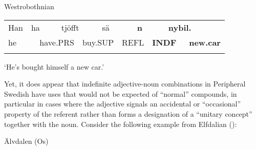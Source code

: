 \begin{listWWNumileveli}
\item {}

\begin{styleExample}
\label{bkm:Ref154565993}Westrobothnian

\end{styleExample}

\end{listWWNumileveli}

\begin{tabular}{llllllllllll}
\lsptoprule
Han & \multicolumn{2}{l}{ha

} & \multicolumn{2}{l}{tjöfft

} & \multicolumn{2}{l}{sä

} & \multicolumn{2}{l}{{\bfseries n}

} & \multicolumn{2}{l}{{\bfseries nybil.}

} & \\
\multicolumn{2}{l}{he

} & \multicolumn{2}{l}{have.PRS

} & \multicolumn{2}{l}{buy.SUP

} & \multicolumn{2}{l}{REFL

} & \multicolumn{2}{l}{{\bfseries INDF}

} & \multicolumn{2}{l}{{\bfseries new.car}

}\\
\lspbottomrule
\end{tabular}

\begin{styleTranslation}
‘He’s bought himself a new car.’

\end{styleTranslation}

\begin{styleBodyTextFirst}
Yet, it does appear that indefinite adjective-noun combinations in Peripheral Swedish have uses that would not be expected of “normal” compounds, in particular in cases where the adjective signals an accidental or “occasional” property of the referent rather than forms a designation of a “unitary concept” together with the noun. Consider the following example from Elfdalian (\citet[142]{Levander1909}):

\end{styleBodyTextFirst}

\begin{listWWNumileveli}
\item {}

\begin{styleExample}
Älvdalen (Os)

\end{styleExample}

\end{listWWNumileveli}

